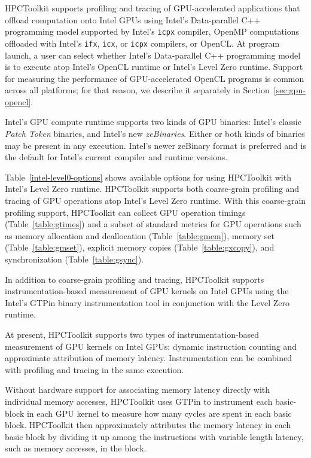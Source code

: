 HPCToolkit supports profiling and tracing of GPU-accelerated  applications that offload computation onto Intel GPUs using  Intel's Data-parallel C++ programming model supported by Intel's {\tt icpx} compiler, OpenMP computations offloaded with Intel's {\tt ifx}, {\tt icx}, or {\tt icpx} compilers, or OpenCL. At program launch, a user can select whether Intel's Data-parallel C++ programming model is to execute atop Intel's OpenCL runtime or Intel's Level Zero runtime. Support for measuring the performance of GPU-accelerated OpenCL programs is common across all platforms; for that reason, we describe it separately in Section~\ref{sec:gpu-opencl}.

Intel's GPU compute runtime supports two kinds of GPU binaries: Intel's classic {\em Patch Token} binaries, and Intel's new {\em zeBinaries}. Either or both kinds of binaries may be present in any execution. Intel's newer zeBinary format is preferred and is the default for Intel's current compiler and runtime versions.

Table~\ref{intel-level0-options} shows available options for using HPCToolkit with Intel's Level Zero runtime. HPCToolkit supports both coarse-grain profiling and tracing of GPU operations atop Intel's Level Zero runtime. With this coarse-grain profiling support, HPCToolkit can collect GPU operation timings (Table~\ref{table:gtimes}) and a subset of standard metrics for GPU operations such as memory allocation and deallocation (Table~\ref{table:gmem}), memory set (Table~\ref{table:gmset}), explicit memory copies (Table~\ref{table:gxcopy}), and synchronization (Table~\ref{table:gsync}). 

In addition to coarse-grain profiling and tracing, HPCToolkit supports instrumentation-based measurement of GPU kernels on Intel GPUs using the Intel's GTPin binary instrumentation tool in conjunction with the Level Zero runtime. 



 At present, HPCToolkit supports two types of instrumentation-based measurement of GPU kernels on Intel GPUs: dynamic instruction counting and approximate attribution of memory latency. 
 Instrumentation can be combined with profiling and tracing in the same execution.

 Without hardware support for associating memory latency directly with individual memory accesses, HPCToolkit uses GTPin to instrument each basic-block in each GPU kernel to measure how many cycles are spent in each basic block. HPCToolkit then
 approximately attributes the memory latency in each basic block by dividing it up among the instructions with variable length latency, such as memory accesses, in the block. 

